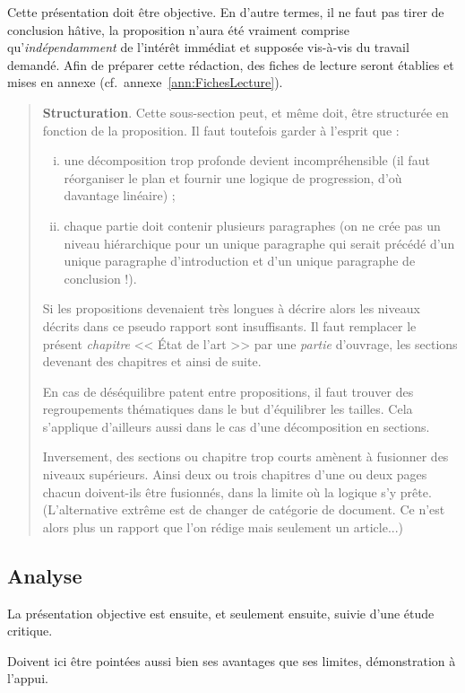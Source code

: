 \documentclass[11pt, french]{report-rd-info}
\newenvironment{structuration}{\begin{quote}\textbf{Structuration}. }{\end{quote}}
\begin{document}
Cette présentation doit être objective. En d'autre termes, il ne faut pas tirer de conclusion hâtive, la proposition n'aura été vraiment comprise qu'\emph{indépendamment} de l'intérêt immédiat et supposée vis-à-vis du travail demandé. Afin de préparer cette rédaction, des fiches de lecture seront établies et mises en annexe (cf.\ annexe~\ref{ann:FichesLecture}).
\begin{structuration}
Cette sous-section peut, et même doit, être structurée en fonction de la proposition. Il faut toutefois garder à l'esprit que :
\begin{enumerate}[(i)]
    \item une décomposition trop profonde devient incompréhensible (il faut réorganiser le plan et fournir une logique de progression, d'où davantage linéaire) ;
    \item chaque partie doit contenir plusieurs paragraphes (on ne crée pas un niveau hiérarchique pour un unique paragraphe qui serait précédé d'un unique paragraphe d'introduction et d'un unique paragraphe de conclusion !).
\end{enumerate}

Si les propositions devenaient très longues à décrire alors les niveaux décrits dans ce pseudo rapport sont insuffisants. Il faut remplacer le présent \emph{chapitre} << \'Etat de l'art >> par une \emph{partie} d'ouvrage, les sections devenant des chapitres et ainsi de suite.

En cas de déséquilibre patent entre propositions, il faut trouver des regroupements thématiques dans le but d'équilibrer les tailles.  Cela s'applique d'ailleurs aussi dans le cas d'une décomposition en sections.

Inversement, des sections ou chapitre trop courts amènent à fusionner des niveaux supérieurs. Ainsi deux ou trois chapitres d'une ou deux pages chacun doivent-ils être fusionnés, dans la limite où la logique s'y prête. (L'alternative extrême est de changer de catégorie de document. Ce n'est alors plus un rapport que l'on rédige mais seulement un article...)
\end{structuration}

\subsection{Analyse}

La présentation objective est ensuite, et seulement ensuite, suivie d'une étude critique.

Doivent ici être pointées aussi bien ses avantages que ses limites, démonstration à l'appui.
\end{document}
